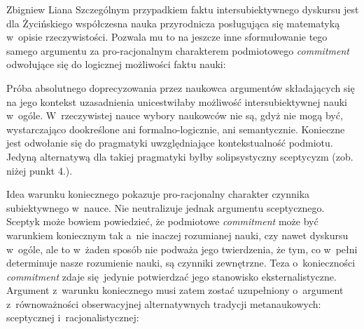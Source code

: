 \begin{artplenv}{Zbigniew Liana}
Szczególnym przypadkiem faktu intersubiektywnego dyskursu jest dla Życińskiego współczesna nauka przyrodnicza posługująca się matematyką w~opisie rzeczywistości. Pozwala mu to na jeszcze inne sformułowanie tego samego argumentu za pro-racjonalnym charakterem podmiotowego \textit{commitment} odwołujące się do logicznej możliwości faktu nauki:



Próba absolutnego doprecyzowania przez naukowca argumentów składających się na jego kontekst uzasadnienia unicestwiłaby możliwość intersubiektywnej nauki w~ogóle. W~rzeczywistej nauce wybory naukowców nie są, gdyż nie mogą być, wystarczająco dookreślone ani formalno-logicznie, ani semantycznie. Konieczne jest odwołanie się do pragmatyki uwzględniające kontekstualność podmiotu. Jedyną alternatywą dla takiej pragmatyki byłby solipsystyczny sceptycyzm (zob. niżej punkt 4.).

Idea warunku koniecznego pokazuje pro-racjonalny charakter czynnika subiektywnego w~nauce. Nie neutralizuje jednak argumentu sceptycznego. Sceptyk może bowiem powiedzieć, że podmiotowe \textit{commitment} może być warunkiem koniecznym tak a~nie inaczej rozumianej nauki, czy nawet dyskursu w~ogóle, ale to w~żaden sposób nie podważa jego twierdzenia, że tym, co w~pełni determinuje nasze rozumienie nauki, są czynniki zewnętrzne. Teza o~konieczności \textit{commitment} zdaje się~jedynie potwierdzać jego stanowisko eksternalistyczne. Argument z~warunku koniecznego musi zatem zostać uzupełniony o~argument z~równoważności obserwacyjnej alternatywnych tradycji metanaukowych: sceptycznej i~racjonalistycznej:




\end{artplenv}
